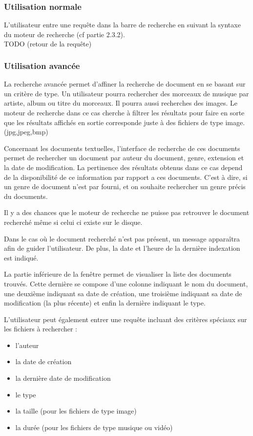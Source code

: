 \documentclass[a4paper,10pt]{article}
\begin{document}
\subsubsection{Utilisation normale}
L'utilisateur entre une requête dans la barre de recherche en suivant la syntaxe
du moteur de recherche (cf partie 2.3.2).\\
TODO (retour de la requête)


\subsubsection{Utilisation avancée}

La recherche avancée permet d'affiner la recherche de document en se basant sur un critère de type.
Un utilisateur pourra rechercher des morceaux de musique par artiste, album ou titre du morceaux.
Il pourra aussi recherches des images. Le moteur de recherche dans ce cas cherche à filtrer les résultats pour faire en sorte que
les résultats affichés en sortie corresponde juste à des fichiers de type image. (jpg,jpeg,bmp)

Concernant les documents textuelles, l'interface de recherche de ces documents permet de rechercher un document par auteur du document, genre, extension et la date de modification. La pertinence des résultats obtenus dans ce cas depend de la disponibilité de ce information par rapport a ces documents. C'est à dire, si un genre de document n'est par fourni, et on souhaite rechercher un genre précis du documents.

Il y a des chances que le moteur de recherche ne puisse pas retrouver le document recherché même si celui ci existe sur le disque.

Dans le cas où le document recherché n'est pas présent, un message apparaîtra afin de guider l'utilisateur. 
De plus, la date et l'heure de la dernière indexation est indiqué.

La partie inférieure de la fenêtre permet de visualiser la liste des documents trouvés. 
Cette dernière se compose d'une colonne indiquant le nom du document, une deuxième indiquant sa date de création, une troisième indiquant sa date de modification (la plus récente) et enfin la dernière indiquant le type.



L'utilisateur peut également entrer une requête incluant des critères spéciaux
sur les fichiers à rechercher :
\begin{itemize}
 \item l'auteur
 \item la date de création
 \item la dernière date de modification
 \item le type
 \item la taille (pour les fichiers de type image)
 \item la durée (pour les fichiers de type musique ou vidéo)
\end{itemize}
\end{document}
